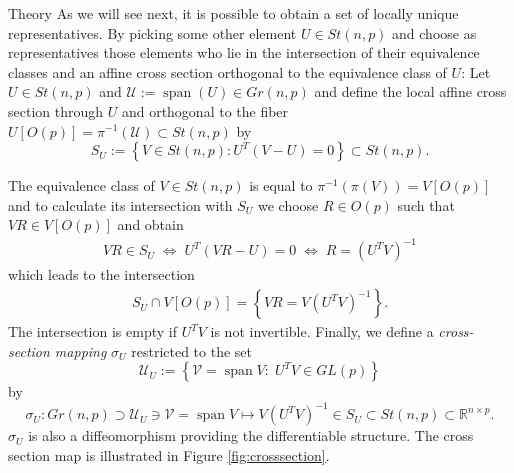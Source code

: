 \begin{chapter}{Theory}
As we will see next, it is possible to obtain a set of locally unique representatives. By picking some other element $U\in St(n,p)$ and choose as representatives those elements who lie in the intersection of their equivalence classes and an affine cross section
orthogonal to the equivalence class of $U$: Let $U\in St(n,p)$ and $\mathcal{U}:=\operatorname{span}(U) \in Gr(n,p)$ and define the local affine cross section through $U$ and orthogonal to the fiber $U[O(p)]=\pi^{-1}(\mathcal{U})\subset St(n,p)$ by
\begin{equation}
    S_U := \left\lbrace V\in St(n,p): U^T(V-U)=0 \right\rbrace\subset St(n,p).
\end{equation}

The equivalence class of $V\in St(n,p)$ is equal to $\pi^{-1}(\pi(V))=V[O(p)]$ and to calculate its intersection with $S_U$ we choose $R\in O(p)$ such that
$VR\in V[O(p)]$ and obtain
\begin{align}
    VR\in S_U\;\Leftrightarrow\; U^T(VR-U)=0 \;\Leftrightarrow\; R = (U^TV)^{-1}
\end{align}
which leads to the intersection
\begin{align}
    S_U \cap V[O(p)] = \left\lbrace VR = V(U^{T}V)^{-1} \right\rbrace .
\end{align}
The intersection is empty if $U^{T}V$ is not invertible. Finally, we define a \emph{cross-section mapping} $\sigma_U$ restricted to the set
\begin{equation}
    \mathcal{U}_U := \left\lbrace\mathcal{V}=\operatorname{span}V:\; U^TV\in GL(p) \right\rbrace
\end{equation}
by 
\begin{equation}
\label{eq:crosssectionmap}
    \sigma_U: Gr(n,p)\supset \mathcal{U}_U\ni\mathcal{V}=\operatorname{span}V\mapsto V(U^{T}V)^{-1} \in S_U \subset St(n,p)\subset \mathbb{R}^{n\times p}.
\end{equation}
$\sigma_U$ is also a diffeomorphism providing the differentiable structure. The cross section map is
illustrated in Figure \ref{fig:crosssection}.\\


\end{chapter}
